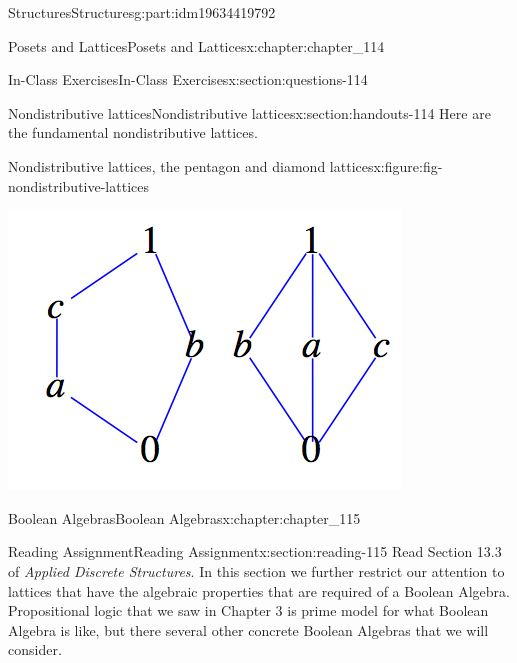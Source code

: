 \documentclass[oneside,10pt,]{book}
\numberwithin{equation}{section}
\begin{document}
\begin{partptx}{Structures}{}{Structures}{}{}{g:part:idm19634419792}
\begin{chapterptx}{Posets and Lattices}{}{Posets and Lattices}{}{}{x:chapter:chapter_114}
\begin{sectionptx}{In-Class Exercises}{}{In-Class Exercises}{}{}{x:section:questions-114}
\begin{enumerate}[label=\arabic*.]
\end{enumerate}
%
\end{sectionptx}
%
%
\typeout{************************************************}
\typeout{************************************************}
%
\begin{sectionptx}{Nondistributive lattices}{}{Nondistributive lattices}{}{}{x:section:handouts-114}
%
Here are the fundamental nondistributive lattices.%
\begin{figureptx}{Nondistributive lattices, the pentagon and diamond lattices}{x:figure:fig-nondistributive-lattices}{}%
\begin{image}{0.25}{0.5}{0.25}%
\includegraphics[width=\linewidth]{images/fig-nondistributive-lattices.png}
\end{image}%
\tcblower
\end{figureptx}%
\end{sectionptx}
\end{chapterptx}
%
\typeout{************************************************}
\typeout{************************************************}
%
\begin{chapterptx}{Boolean Algebras}{}{Boolean Algebras}{}{}{x:chapter:chapter_115}
%
%
%
\typeout{************************************************}
\typeout{************************************************}
%
\begin{sectionptx}{Reading Assignment}{}{Reading Assignment}{}{}{x:section:reading-115}
Read Section 13.3 of \emph{Applied Discrete Structures}.  In this section we further restrict our attention to lattices that have the algebraic properties that are required of a Boolean Algebra. Propositional logic that we saw in Chapter 3 is prime model for what Boolean Algebra is like, but there several other concrete Boolean Algebras that we will consider.%

\end{sectionptx}
\end{chapterptx}
\end{partptx}
\end{document}
